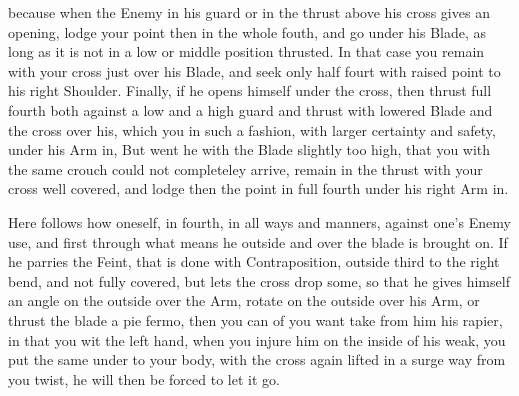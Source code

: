 because when the Enemy in his guard or in the thrust above his cross
gives an opening, lodge your point then in the whole fouth, and go
under his Blade, as long as it is not in a low or middle position thrusted.
In that case you remain with your cross just over his Blade, and seek
only half fourt with raised point to his right Shoulder. Finally, if
he opens himself under the cross, then thrust full fourth both against
a low and a high guard and thrust with lowered Blade and the cross
over his, which you in such a fashion, with larger certainty and
safety, under his Arm in,
But went he with the Blade slightly too high, that you with the same
crouch could not completeley arrive, remain in the thrust with your
cross well covered, and lodge then the point in full fourth under his
right Arm in.

Here follows how oneself, in fourth, in all ways and manners, against one's
Enemy use, and first through what means he outside and over the blade
is brought on. If he parries the Feint, that is done with
Contraposition, outside third to the right bend, and not fully
covered, but lets the cross drop some, so that he gives himself an
angle on the outside over the Arm, rotate on the outside over his Arm,
or thrust the blade a pie fermo, then you can of you want take from
him his rapier, in that you wit the left hand, when you injure him on
the inside of his weak, you put the same under to your body, with the
cross again lifted in a surge way from you twist, he will then be
forced to let it go.

